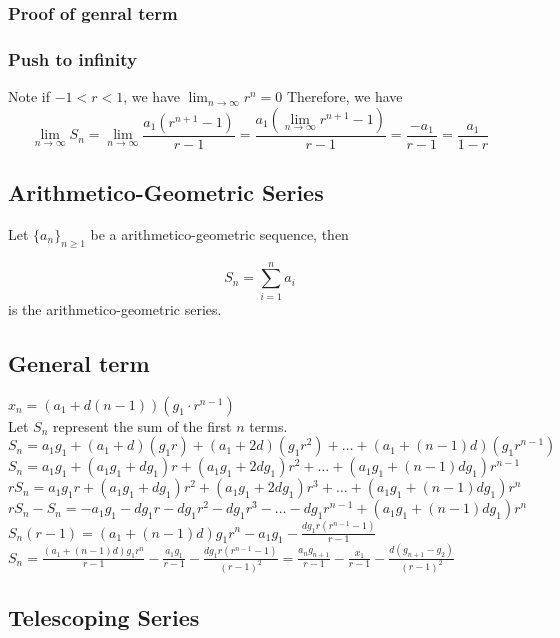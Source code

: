 \documentclass{article}
\begin{document}
\subsubsection{Proof of genral term}
\vspace{30px}
\subsubsection{Push to infinity}

Note if $-1<r<1$, we have $\lim_{n \to \infty} r^n=0$
Therefore, we have $$\lim_{n \to \infty} S_n = \lim_{n \to \infty} \frac{a_1(r^{n+1}-1)}{r-1} = \frac{a_1(\lim_{n \to \infty} r^{n+1}-1)}{r-1} = \frac{-a_1}{r-1} = \frac{a_1}{1-r}$$

\subsection{Arithmetico-Geometric Series}

Let $\{a_n\}_{n\ge1}$ be a arithmetico-geometric sequence, then 

$$S_n=\sum_{i=1}^{n}a_i$$ 
is the arithmetico-geometric series.

\subsection{General term}
$x_n=(a_1+d(n-1))(g_1\cdot r^{n-1})$\\
Let $S_n$ represent the sum of the first $n$ terms. \\
$S_n=a_1g_1+(a_1+d)(g_1r)+(a_1+2d)(g_1r^2)+\ldots+(a_1+(n-1)d)(g_1r^{n-1})$\\
$S_n=a_1g_1+(a_1g_1+dg_1)r+(a_1g_1+2dg_1)r^2+\ldots+(a_1g_1+(n-1)dg_1)r^{n-1}$\\
$rS_n=a_1g_1r+(a_1g_1+dg_1)r^2+(a_1g_1+2dg_1)r^3+\ldots+(a_1g_1+(n-1)dg_1)r^{n}$\\
$rS_n-S_n=-a_1g_1-dg_1r-dg_1r^2-dg_1r^3-\ldots-dg_1r^{n-1}+(a_1g_1+(n-1)dg_1)r^n$\\
$S_n(r-1)=(a_1+(n-1)d)g_1r^n-a_1g_1-\frac{dg_1r(r^{n-1}-1)}{r-1}$\\
$S_n=\frac{(a_1+(n-1)d)g_1r^n}{r-1}-\frac{a_1g_1}{r-1}-\frac{dg_1r(r^{n-1}-1)}{(r-1)^2}=\frac{a_ng_{n+1}}{r-1}-\frac{x_1}{r-1}-\frac{d(g_{n+1}-g_2)}{(r-1)^2}$

\subsection{Telescoping Series}
\end{document}
